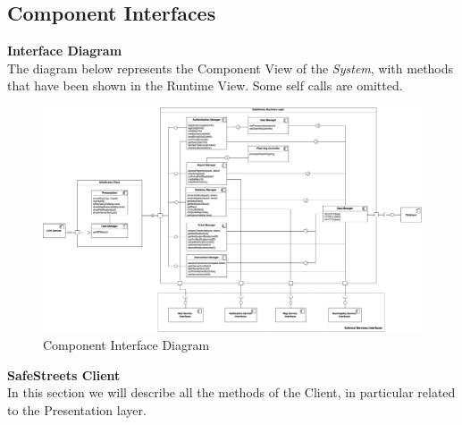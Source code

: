 \documentclass{article}
\begin{document}
	\subsection{Component Interfaces}
	{\bf Interface Diagram} \\
	The diagram below represents the Component View of the {\it System}, with methods that have been shown in the Runtime View. Some self calls are omitted. 
		\begin{figure}[H]
			\centering
			\includegraphics[scale=0.20]{Images/Diagrams/interface_diagram.png}
			\caption{Component Interface Diagram}
		\end{figure}	
	\noindent
	{\bf SafeStreets Client} 
	\\ 
	In this section we will describe all the methods of the Client, in particular related to the Presentation layer.
\end{document}

